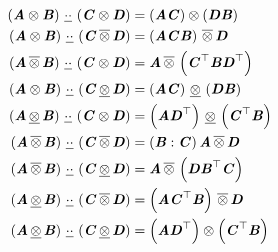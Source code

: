 \begin{align}
  \lowerdoubledotprod{\pbrac{\tensorprod{\tensortwo{A}}{\tensortwo{B}}}}{\pbrac{\tensorprod{\tensortwo{C}}{\tensortwo{D}}}}&=\tensorprod{\pbrac{\tensortwo{A}{\tensortwo{C}}}}{\pbrac{\tensortwo{D}{\tensortwo{B}}}}\\
  \lowerdoubledotprod{\pbrac{\tensorprod{\tensortwo{A}}{\tensortwo{B}}}}{\pbrac{\uppertensorprod{\tensortwo{C}}{\tensortwo{D}}}}&=\uppertensorprod{\pbrac{\tensortwo{A}\tensortwo{C}\tensortwo{B}}}{\tensortwo{D}}\\
  \lowerdoubledotprod{\pbrac{\uppertensorprod{\tensortwo{A}}{\tensortwo{B}}}}{\pbrac{\tensorprod{\tensortwo{C}}{\tensortwo{D}}}}&=\uppertensorprod{\tensortwo{A}}{\pbrac{\transpose{\tensortwo{C}}\tensortwo{B}\transpose{\tensortwo{D}}}}\\
  \lowerdoubledotprod{\pbrac{\tensorprod{\tensortwo{A}}{\tensortwo{B}}}}{\pbrac{\lowertensorprod{\tensortwo{C}}{\tensortwo{D}}}}&=\lowertensorprod{\pbrac{\tensortwo{A}\tensortwo{C}}}{\pbrac{\tensortwo{D}\tensortwo{B}}}\\
  \lowerdoubledotprod{\pbrac{\lowertensorprod{\tensortwo{A}}{\tensortwo{B}}}}{\pbrac{\tensorprod{\tensortwo{C}}{\tensortwo{D}}}}&=\lowertensorprod{\pbrac{\tensortwo{A}\transpose{\tensortwo{D}}}}{\pbrac{\transpose{\tensortwo{C}}\tensortwo{B}}}\\
  \lowerdoubledotprod{\pbrac{\uppertensorprod{\tensortwo{A}}{\tensortwo{B}}}}{\pbrac{\uppertensorprod{\tensortwo{C}}{\tensortwo{D}}}}&=\uppertensorprod{\pbrac{\doubledotprod{\tensortwo{B}}{\tensortwo{C}}}\tensortwo{A}}{\tensortwo{D}}\\
  \lowerdoubledotprod{\pbrac{\uppertensorprod{\tensortwo{A}}{\tensortwo{B}}}}{\pbrac{\lowertensorprod{\tensortwo{C}}{\tensortwo{D}}}}&=\uppertensorprod{\tensortwo{A}}{\pbrac{\tensortwo{D}\transpose{\tensortwo{B}}\tensortwo{C}}}\\
  \lowerdoubledotprod{\pbrac{\lowertensorprod{\tensortwo{A}}{\tensortwo{B}}}}{\pbrac{\uppertensorprod{\tensortwo{C}}{\tensortwo{D}}}}&=\uppertensorprod{\pbrac{\tensortwo{A}\transpose{\tensortwo{C}}\tensortwo{B}}}{\tensortwo{D}}\\
  \lowerdoubledotprod{\pbrac{\lowertensorprod{\tensortwo{A}}{\tensortwo{B}}}}{\pbrac{\lowertensorprod{\tensortwo{C}}{\tensortwo{D}}}}&=\tensorprod{\pbrac{\tensortwo{A}\transpose{\tensortwo{D}}}}{\pbrac{\transpose{\tensortwo{C}}\tensortwo{B}}}
\end{align}

